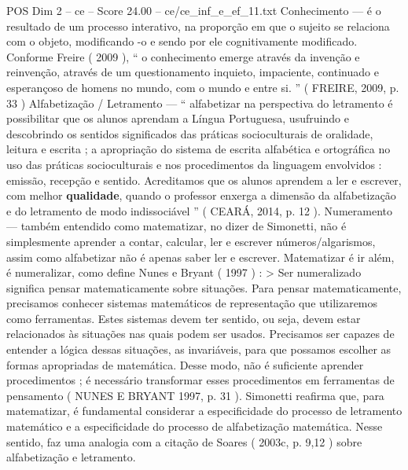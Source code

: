 \begin{textsample}{POS Dim 2 – ce – Score 24.00 – ce/ce\_inf\_e\_ef\_11.txt}
Conhecimento — é o resultado de um processo interativo, na proporção em que o sujeito se relaciona com o objeto, modificando -o e sendo por ele cognitivamente modificado.
Conforme Freire ( 2009 ), “ o conhecimento emerge através da invenção e reinvenção, através de um questionamento inquieto, impaciente, continuado e esperançoso de homens no mundo, com o mundo e entre si. ” ( FREIRE, 2009, p. 33 ) Alfabetização / Letramento — “ alfabetizar na perspectiva do letramento é possibilitar que os alunos aprendam a Língua Portuguesa, usufruindo e descobrindo os sentidos significados das práticas socioculturais de oralidade, leitura e escrita ; a apropriação do sistema de escrita alfabética e ortográfica no uso das práticas socioculturais e nos procedimentos da linguagem envolvidos : emissão, recepção e sentido.
Acreditamos que os alunos aprendem a ler e escrever, com melhor \textbf{qualidade}, quando o professor enxerga a dimensão da alfabetização e do letramento de modo indissociável ” ( CEARÁ, 2014, p. 12 ).
Numeramento — também entendido como matematizar, no dizer de Simonetti, não é simplesmente aprender a contar, calcular, ler e escrever números/algarismos, assim como alfabetizar não é apenas saber ler e escrever.
Matematizar é ir além, é numeralizar, como define Nunes e Bryant ( 1997 ) : > Ser numeralizado significa pensar matematicamente sobre situações.
Para pensar matematicamente, precisamos conhecer sistemas matemáticos de representação que utilizaremos como ferramentas.
Estes sistemas devem ter sentido, ou seja, devem estar relacionados às situações nas quais podem ser usados.
Precisamos ser capazes de entender a lógica dessas situações, as invariáveis, para que possamos escolher as formas apropriadas de matemática.
Desse modo, não é suficiente aprender procedimentos ; é necessário transformar esses procedimentos em ferramentas de pensamento ( NUNES E BRYANT 1997, p. 31 ).
Simonetti reafirma que, para matematizar, é fundamental considerar a especificidade do processo de letramento matemático e a especificidade do processo de alfabetização matemática.
Nesse sentido, faz uma analogia com a citação de Soares ( 2003c, p. 9,12 ) sobre alfabetização e letramento.

\end{textsample}
